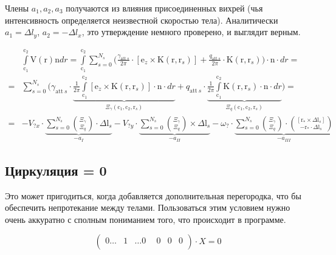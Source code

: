 \documentclass[14pt]{extreport}
\newcommand{\br}[1]{\boldsymbol{\mathrm{#1}}}
\renewcommand{\vec}[1]{\br{#1}}
\newcommand{\att}{\text{att}}
\begin{document}
Члены $a_1, a_2, a_3$ получаются из влияния присоединенных вихрей (чья интенсивность определяется неизвестной скоростью тела). Аналитически $a_1 = \Delta l_y$, $a_2 = -\Delta l_x$, это утверждение немного проверено, и выглядит верным.

\begin{equation}
\begin{split}
&\int\limits_{\vec c_1}^{\vec c_2} {\vec V(\vec r)\vec n dr}
= \int\limits_{\vec c_1}^{\vec c_2} {
	\sum\limits_{s=0}^{N_s} {
		\biggl (
		\frac{\gamma_{\att~s}}{2\pi} \cdot [\vec e_z \times \vec K(\vec r, \vec r_s)] +
		\frac{q_{\att~s}}{2\pi} \cdot \vec K(\vec r, \vec r_s)
		\biggr )
	}
	\cdot \vec n \cdot  dr
} = \\ =
&\sum\limits_{s=0}^{N_s} {
	\biggl (
	\gamma_{\att~s} \cdot 
	\underbrace{
	\frac{1}{2\pi}
	\int\limits_{\vec c_1}^{\vec c_2} {
		[\vec e_z \times \vec K(\vec r, \vec r_s)] \cdot \vec n \cdot dr
	}}_{\Xi_\gamma(\vec c_1, \vec c_2, \vec r_s)} + 
	q_{\att~s} \cdot
	\underbrace{
	\frac{1}{2\pi}
	\int\limits_{\vec c_1}^{\vec c_2} {
		\vec K(\vec r, \vec r_s) \cdot \vec n \cdot dr
	}}_{\Xi_q(\vec c_1, \vec c_2, \vec r_s)}
	\biggr )
} = \\ =
&-V_{?x} \cdot \underbrace{
	\sum\limits_{s=0}^{N_s} {\binom{\Xi_\gamma}{\Xi_q} \cdot \Delta \vec l_s}
}_{-a_I}
-V_{?y} \cdot \underbrace{
	\sum\limits_{s=0}^{N_s} {\binom{\Xi_\gamma}{\Xi_q} \times \Delta \vec l_s}
}_{-a_{II}}
-\omega_? \cdot \underbrace{
	\sum\limits_{s=0}^{N_s} {\binom{\Xi_\gamma}{\Xi_q} \cdot \binom{[\vec r_* \times \Delta \vec l_s]}{-\vec r_* \cdot \Delta \vec l_s}}
}_{-a_{III}}
\end{split}
\end{equation}

\subsection{Циркуляция = 0}

Это может пригодиться, когда добавляется дополнительная перегородка, что бы обеспечить непротекание между телами.
Пользоваться этим условием нужно очень аккуратно с сполным пониманием того, что происходит в программе.

\begin{equation*}
\left(\begin{matrix}
0\dotsc& 1& \dotsc 0& ~~0& 0& 0\\
\end{matrix}\right)
\cdot X = 0
\end{equation*}
\end{document}
